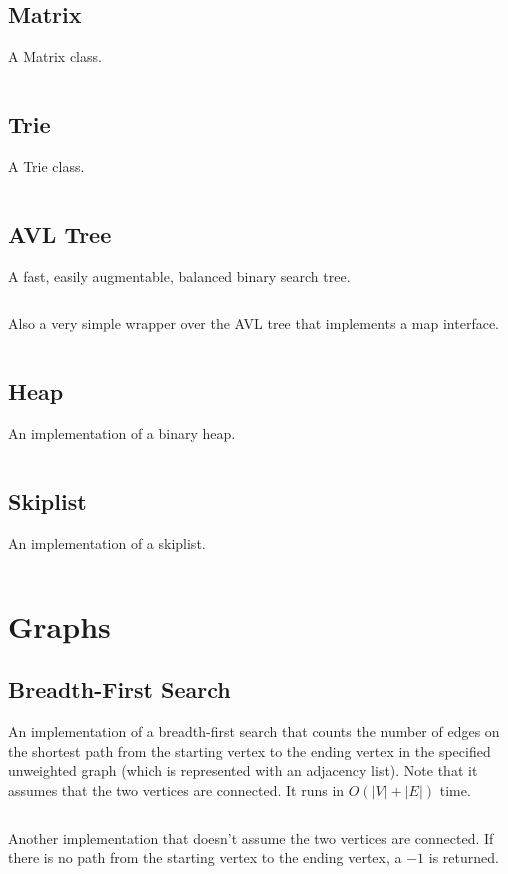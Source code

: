 \documentclass[8pt,a4paper]{amsart}
\newcommand{\code}[1]{\inputminted[linenos]{cpp}{_code/#1}}
\begin{document}
    \subsection{Matrix}
        A Matrix class.
        \code{data-structures/matrix.cpp}

    \subsection{Trie}
        A Trie class.
        \code{data-structures/trie.cpp}

    \subsection{AVL Tree}
        A fast, easily augmentable, balanced binary search tree.
        \code{data-structures/avl_tree.cpp}

        Also a very simple wrapper over the AVL tree that implements a map
        interface.
        \code{data-structures/avl_map.cpp}

    \subsection{Heap}
        An implementation of a binary heap.
        \code{data-structures/heap.cpp}

    \subsection{Skiplist}
        An implementation of a skiplist.
        \code{data-structures/skiplist.cpp}

\section{Graphs}
    \subsection{Breadth-First Search}
        An implementation of a breadth-first search that counts the number of
        edges on the shortest path from the starting vertex to the ending
        vertex in the specified unweighted graph (which is represented with an
        adjacency list). Note that it assumes that the two vertices are
        connected. It runs in $O(|V|+|E|)$ time.
        \code{graph/bfs.cpp}

        Another implementation that doesn't assume the two vertices are
        connected. If there is no path from the starting vertex to the ending
        vertex, a $-1$ is returned.
        \code{graph/bfs_visited.cpp}
\end{document}
